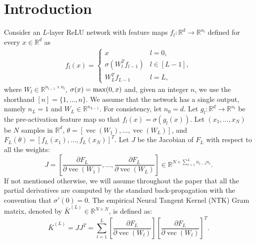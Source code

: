 \documentclass[11pt]{article}
\def\RR{\mathbb{R}}
\def\vec{\operatorname{\mathop{vec}}}
\newcommand{\distas}[1]{\mathbin{\overset{#1}{\sim}}}
\def\max{\mathop{\rm max}\nolimits}
\begin{document}
\section{Introduction}
Consider an $L$-layer ReLU network with feature maps $f_l:\RR^d\to\RR^{n_l}$ defined for every $x\in\RR^d$ as
\begin{align}\label{eq:def_feature_map}
    f_l(x)=\begin{cases}
	    x & l=0,\\
	    \sigma(W_l^T f_{l-1}) & l\in[L-1],\\
	    W_L^T f_{L-1} & l=L, 
        \end{cases}
\end{align}
where $W_l\in\RR^{n_{l-1}\times n_l}$, $\sigma(x)=\max(0,x)$ and, given an integer $n$, we use the shorthand $[n]=\{1, \ldots, n \}$. 
We assume that the network has a single output, namely $n_L=1$ and $W_L\in\RR^{n_{L-1}}.$
For consistency, let $n_0=d.$
Let $g_l:\RR^d\to\RR^{n_l}$ be the pre-activation feature map so that $f_l(x)=\sigma(g_l(x)).$
Let $(x_1,\ldots,x_N)$ be $N$ samples in $\RR^d$, 
$\theta=[\vec(W_1),\ldots,\vec(W_L)]$,
and $F_L(\theta)=[f_L(x_1),\ldots,f_L(x_N)]^T.$
Let $J$ be the Jacobian of $F_L$ with respect to all the weights:
\begin{equation}\label{eq:Jac}
    J =\left[\frac{\partial F_L}{\partial\vec(W_1)},\ldots,\frac{\partial F_L}{\partial\vec(W_L)}\right] \in\RR^{N\times\sum_{l=1}^Ln_{l-1}n_l}.
\end{equation}
If not mentioned otherwise, we will assume throughout the paper that all the partial derivatives 
are computed by the standard back-propagation with the convention that $\sigma'(0)=0$.
The empirical Neural Tangent Kernel (NTK) Gram matrix, denoted by $\bar{K}^{(L)} \in\RR^{N\times N}$, is defined as:
\begin{equation}\label{eq:NTKgramdef}
    \bar{K}^{(L)}
    =J J^T
    =\sum_{l=1}^{L} \left[\frac{\partial F_L}{\partial\vec(W_l)}\right] \left[\frac{\partial F_L}{\partial\vec(W_l)}\right]^T.
\end{equation}
\end{document}
